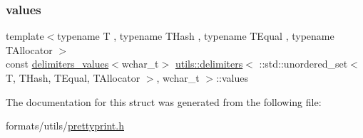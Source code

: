 \subsubsection{\texorpdfstring{values}{values}}
{\footnotesize\ttfamily template$<$typename T , typename T\+Hash , typename T\+Equal , typename T\+Allocator $>$ \\
const \mbox{\hyperlink{structutils_1_1delimiters__values}{delimiters\+\_\+values}}$<$wchar\+\_\+t$>$ \mbox{\hyperlink{structutils_1_1delimiters}{utils\+::delimiters}}$<$ \+::std\+::unordered\+\_\+set$<$ T, T\+Hash, T\+Equal, T\+Allocator $>$, wchar\+\_\+t $>$\+::values\hspace{0.3cm}{\ttfamily [static]}}



The documentation for this struct was generated from the following file\+:\begin{DoxyCompactItemize}
\item 
formats/utils/\mbox{\hyperlink{prettyprint_8h}{prettyprint.\+h}}\end{DoxyCompactItemize}
